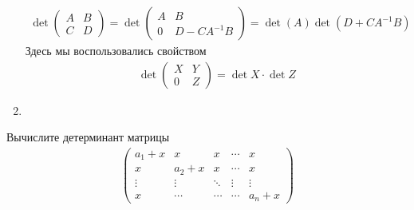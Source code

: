 \begin{sol}
\begin{enumerate}
        \begin{gather*}
            \det \left(
            \begin{array}{cc}
               A &  B \\
               C &  D 
            \end{array}\right) =
            \det
             \left(
            \begin{array}{cc}
               A &  B \\
               0 &  D - C A^{-1}B
            \end{array}\right) = \det (A) \det (D +  C A^{-1} B)
        \end{gather*}
        Здесь мы воспользовались свойством
        \begin{gather*}
            \det \left(
            \begin{array}{cc}
               X &  Y \\
               0 &  Z 
            \end{array}\right) = \det X \cdot \det Z
        \end{gather*}
    
        \item
        
        
        
     \end{enumerate}
\end{sol}

\begin{prb}
Вычислите детерминант матрицы
    \begin{gather*}
        \left(
        \begin{array}{ccccc}
           a_{1} + x & x & x & \cdots & x\\
           x  &  a_{2} + x & x & \cdots & x\\
           \vdots & \vdots & \ddots& \vdots & \vdots\\
           x & \cdots & \cdots & \cdots & a_{n} + x
        \end{array}
        \right)
    \end{gather*}
\end{prb}

